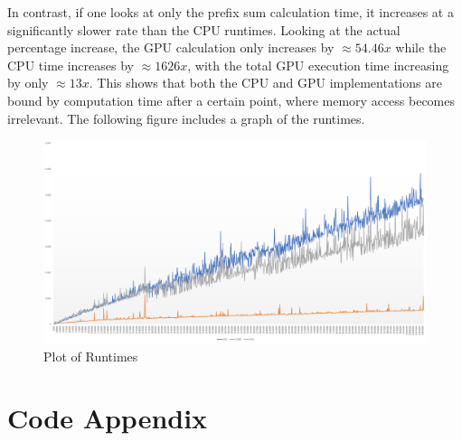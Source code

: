 \documentclass[a4paper, 11pt]{article}
\begin{document}
In contrast, if one looks at only the prefix sum calculation time, it increases at a significantly slower rate than the CPU runtimes. Looking at the actual percentage increase, the GPU calculation only increases by $\approx54.46x$ while the CPU time increases by $\approx1626x$, with the total GPU execution time increasing by only $\approx13x$. This shows that both the CPU and GPU implementations are bound by computation time after a certain point, where memory access becomes irrelevant. The following figure includes a graph of the runtimes.
\newpage
\begin{figure}[H]
	\centering
	\centerline{\includegraphics[width=10.5in,angle=90]{runtimes.png}}
	\caption{Plot of Runtimes}
\end{figure}





\newpage
\section*{Code Appendix}

\end{document}
